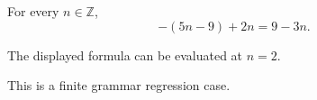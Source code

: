 \documentclass{article}
\begin{document}
\begin{lemma}\label{hold:negative}
For every $n\in\mathbb{Z}$,
\[-(5n-9)+2n=9-3n.\]
\end{lemma}
\begin{example}\label{hold:example}The displayed formula can be evaluated at $n=2$.\end{example}
\begin{remark}\label{hold:remark}This is a finite grammar regression case.\end{remark}
\end{document}
